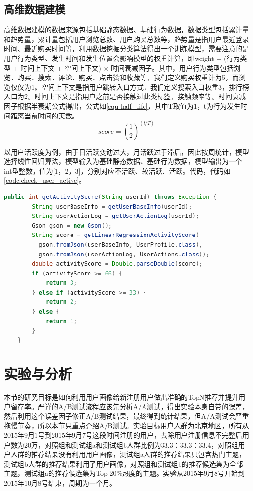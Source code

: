   \subsection{高维数据建模}
  高维数据建模的数据来源包括基础静态数据、基础行为数据，数据类型包括累计量和趋势量，累计量包括用户浏览总数、用户购买总数等，趋势量是指用户最近登录时间、最近购买时间等，利用数据挖掘分类算法得出一个训练模型，需要注意的是用户行为类型、发生时间和发生位置会影响模型的权重计算，即weight = (行为类型 + 时间上下文 + 空间上下文) × 时间衰减因子。其中，用户行为类型包括浏览、购买、搜索、评论、购买、点击赞和收藏等，我们定义购买权重计为5，而浏览仅仅为1。空间上下文是指用户跳转入口方式，我们定义搜索入口权重3，排行榜入口为2。时间上下文是指用户之前是否接触过此类标签，接触频率等。时间衰减因子根据半衰期公式得出，公式如\autoref{equ-half_life}，其中T取值为1，t为行为发生时间距离当前时间的天数。
  \begin{equation}
    score=(\frac{1}{2})^{(t/T)}
    \label{equ-half_life}
  \end{equation}

  以用户活跃度为例，由于日活跃变动过大，月活跃过于滞后，因此按周统计，模型选择线性回归算法，模型输入为基础静态数据、基础行为数据，模型输出为一个int型整数，值为[1，2，3]，分别对应不活跃、较活跃、活跃。代码，代码如\autoref{code:check_user_active}。
  \begin{lstlisting}[language=java,firstnumber=1,label={code:check_user_active}, caption={高维数据建模算法}]
    public int getActivityScore(String userId) throws Exception {
        String userBaseInfo = getUserBaseInfo(userId);
        String userActionLog = getUserActionLog(userId);
        Gson gson = new Gson();
        String score = getLinearRegressionActivityScore(
          gson.fromJson(userBaseInfo, UserProfile.class), 
          gson.fromJson(userActionLog, UserActions.class));
        double activityScore = Double.parseDouble(score);
        if (activityScore >= 66) {
            return 3;
        } else if (activityScore >= 33) {
            return 2;
        } else {
            return 1;
        }
    }
  \end{lstlisting}

  \section{实验与分析}
  本节的研究目标是如何利用用户画像给新注册用户做出准确的TopN推荐并提升用户留存率。严谨的A/B测试流程应该先分析A/A测试，得出实验本身自带的误差，然后利用这个误差因子修正A/B测试结果，最终得到统计结果，但A/A测试会严重拖慢节奏，所以本节只重点介绍A/B测试。实验目标用户人群为北京地区，所有从2015年9月1号到2015年9月7号这段时间注册的用户，去除用户注册信息不完整后用户数为20万，对照组和测试组a和测试组b人群比例为33.3：33.3：33.4，对照组用户人群的推荐结果没有利用用户画像，测试组a人群的推荐结果只包含热门主题，测试组b人群的推荐结果利用了用户画像，对照组和测试组b的推荐候选集为全部主题，测试组a的推荐候选集为Top 20\%热度的主题。实验从2015年9月8号开始到2015年10月8号结束，周期为一个月。
